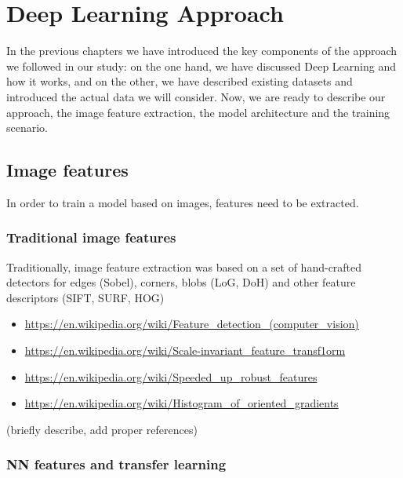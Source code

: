 
\chapter{Deep Learning Approach}

\label{Chapter4}


In the previous chapters we have introduced the key components of the approach we followed in our study: on the one hand, we have discussed Deep Learning and how it works, and on the other, we have described existing datasets and introduced the actual data we will consider. Now, we are ready to describe our approach, the image feature extraction, the model architecture and the training scenario.

\section{Image features}

In order to train a model based on images, features need to be extracted.

\subsection{Traditional image features}

Traditionally, image feature extraction was based on a set of hand-crafted detectors for edges (Sobel), corners, blobs (LoG, DoH) and other feature descriptors (SIFT, SURF, HOG)

\begin{itemize}
	\item \url{https://en.wikipedia.org/wiki/Feature_detection_(computer_vision)}
	\item \url{https://en.wikipedia.org/wiki/Scale-invariant_feature_transf1orm}
	\item \url{https://en.wikipedia.org/wiki/Speeded_up_robust_features}
	\item \url{https://en.wikipedia.org/wiki/Histogram_of_oriented_gradients}
\end{itemize}

(briefly describe, add proper references)

\subsection{NN features and transfer learning}


